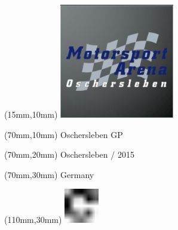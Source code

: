 \null\newpage
\begin{textblock*}{50mm}(15mm,10mm)%
\includegraphics[width=50mm]{LG/2015-05-20_00090.png}
\end{textblock*}
\begin{textblock*}{130mm}(70mm,10mm)%
{\fontsize{20}{20}\selectfont Oschersleben GP}\\
\end{textblock*}
\begin{textblock*}{120mm}(70mm,20mm)%
{\fontsize{16}{16}\selectfont Oschersleben / 2015}\\
\end{textblock*}
\begin{textblock*}{120mm}(70mm,30mm)%
{\fontsize{12}{12}\selectfont Germany}
\end{textblock*}
\begin{textblock*}{30mm}(110mm,30mm)%
\centering
\includegraphics[height=15mm]{icons/fa-rotate-right.pdf}
\end{textblock*}

